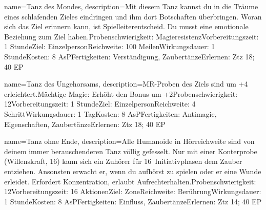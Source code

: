 {
    name={Tanz des Mondes},
    description={Mit diesem Tanz kannst du in die Träume eines schlafenden Zieles eindringen und ihm dort Botschaften überbringen. Woran sich das Ziel erinnern kann, ist Spielleiterentscheid. Du musst eine emotionale Beziehung zum Ziel haben.\newline Probenschwierigkeit: Magieresistenz\newline Vorbereitungszeit: 1 Stunde\newline Ziel: Einzelperson\newline Reichweite: 100 Meilen\newline Wirkungsdauer: 1 Stunde\newline Kosten: 8 AsP\newline Fertigkeiten: Verständigung, Zaubertänze\newline Erlernen: Ztz 18; 40 EP}
}


{
    name={Tanz des Ungehorsams},
    description={MR-Proben des Ziels sind um +4 erleichtert.\newline Mächtige Magie: Erhöht den Bonus um +2\newline Probenschwierigkeit: 12\newline Vorbereitungszeit: 1 Stunde\newline Ziel: Einzelperson\newline Reichweite: 4 Schritt\newline Wirkungsdauer: 1 Tag\newline Kosten: 8 AsP\newline Fertigkeiten: Antimagie, Eigenschaften, Zaubertänze\newline Erlernen: Ztz 18; 40 EP}
}


{
    name={Tanz ohne Ende},
    description={Alle Humanoide in Hörreichweite sind von deinem immer berauschenderen Tanz völlig gefesselt. Nur mit einer Konterprobe (Willenskraft, 16) kann sich ein Zuhörer für 16 Initiativphasen dem Zauber entziehen. Ansonsten erwacht er, wenn du aufhörst zu spielen oder er eine Wunde erleidet. Erfordert Konzentration, erlaubt Aufrechterhalten.\newline Probenschwierigkeit: 12\newline Vorbereitungszeit: 16 Aktionen\newline Ziel: Zone\newline Reichweite: Berührung\newline Wirkungsdauer: 1 Stunde\newline Kosten: 8 AsP\newline Fertigkeiten: Einfluss, Zaubertänze\newline Erlernen: Ztz 14; 40 EP}
}


